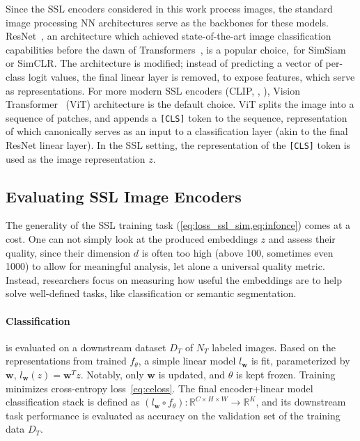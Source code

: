 Since the SSL encoders considered in this work process images, the standard image processing NN architectures serve as the backbones for these models. ResNet~\cite{resnet}, an architecture which achieved state-of-the-art image classification capabilities before the dawn of Transformers~\cite{transformers}, is a popular choice,~\eg for SimSiam or SimCLR. The architecture is modified; instead of predicting a vector of per-class logit values, the final linear layer is removed, to expose features, which serve as representations. For more modern SSL encoders (CLIP, \DINOvone, \DINOvtwo), Vision Transformer~\cite{vit} (ViT) architecture is the default choice. ViT splits the image into a sequence of patches, and appends a \texttt{[CLS]} token to the sequence, representation of which canonically serves as an input to a classification layer (akin to the final ResNet linear layer). In the SSL setting, the representation of the \texttt{[CLS]} token is used as the image representation $z$.

\subsection{Evaluating SSL Image Encoders}\label{sec:eval_ssl}
The generality of the SSL training task (\cref{eq:loss_ssl_sim,eq:infonce}) comes at a cost. One can not simply look at the produced embeddings $z$ and assess their quality, since their dimension $d$ is often too high (above 100, sometimes even 1000) to allow for meaningful analysis, let alone a universal quality metric. Instead, researchers focus on measuring how useful the embeddings are to help solve well-defined tasks, like classification or semantic segmentation. 

\paragraph{Classification} is evaluated on a downstream dataset $D_T$ of $N_T$ labeled images. Based on the representations from trained $f_\theta$, a simple linear model $l_\mathbf{w}$ is fit, parameterized by $\mathbf{w}$, $l_\mathbf{w}(z)=\mathbf{w}^Tz$. Notably, only $\mathbf{w}$ is updated, and $\theta$ is kept frozen. Training minimizes cross-entropy loss~\cref{eq:celoss}. The final encoder+linear model classification stack is defined as $(l_\mathbf{w}\circ f_\theta): \mathbb{R}^{C\times H\times W} \rightarrow \mathbb{R}^K$, and its downstream task performance is evaluated as accuracy on the validation set of the training data $D_T$. 

